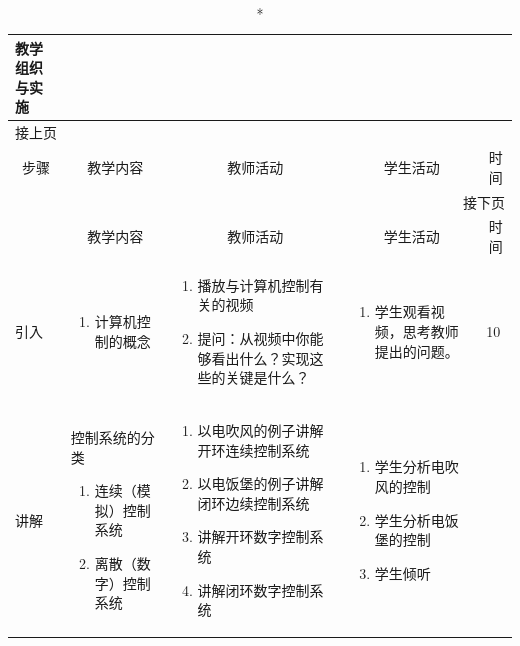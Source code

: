 {%
\begin{landscape}

\begin{longtable}{|m{10mm}|m{50mm}|m{50mm}|m{50mm}|m{15mm}|}
\caption*{\huge 教学组织与实施}\\
\hline
\endfirsthead
\multicolumn{5}{l}{\small 接上页}\\
\hline
\multicolumn{1}{|c|}{步骤}&\multicolumn{1}{c|}{教学内容}&\multicolumn{1}{c|}{教师活动}&\multicolumn{1}{c|}{学生活动}&\multicolumn{1}{c|}{时间}\\
\hline
\endhead

\multicolumn{5}{r}{\small 接下页}\\
\endfoot
\hline
\endlastfoot
\multicolumn{1}{|c|}{步骤}&\multicolumn{1}{c|}{教学内容}&\multicolumn{1}{c|}{教师活动}&\multicolumn{1}{c|}{学生活动}&\multicolumn{1}{c|}{时间}\\\hline
引入&\begin{enumerate}
\item 计算机控制的概念
\end{enumerate} &\begin{enumerate}
\item 播放与计算机控制有关的视频
\item 提问：从视频中你能够看出什么？实现这些的关键是什么？
\end{enumerate} &\begin{enumerate}
\item 学生观看视频，思考教师提出的问题。
\end{enumerate} &10 \\\hline
讲解&控制系统的分类
\begin{enumerate}
\item 连续（模拟）控制系统
\item 离散（数字）控制系统
\end{enumerate} &\begin{enumerate}
\item 以电吹风的例子讲解开环连续控制系统
\item 以电饭堡的例子讲解闭环边续控制系统
\item 讲解开环数字控制系统
\item 讲解闭环数字控制系统
\end{enumerate} &\begin{enumerate}
\item 学生分析电吹风的控制
\item 学生分析电饭堡的控制
\item 学生倾听

\end{enumerate}
\end{longtable}
\end{landscape}}
